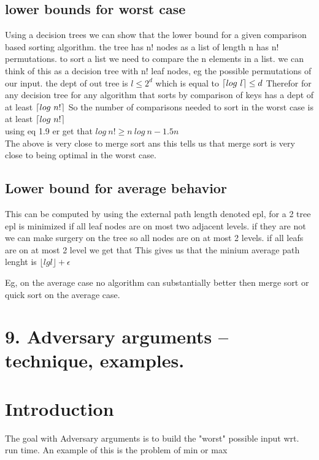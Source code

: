 \documentclass[a4paper,10pt,titlepage]{report}
\DeclarePairedDelimiter{\ceil}{\lceil}{\rceil}
\begin{document}
\subsection{lower bounds for worst case}
Using a decision trees we can show that the lower bound for a given comparison based sorting algorithm. the tree has n! nodes as a list of length n has n! permutations. to sort a list we need to compare the n elements in a list. we can think of this as a decision tree with n! leaf nodes, eg the possible permutations of our input. the dept of out tree is $l \leq 2^d$ which is equal to $\ceil{log \ l} \leq d$ Therefor for any decision tree for any algorithm that sorts by comparison of keys has a dept of at least $\ceil{log \ n!}$
So the number of comparisons needed to sort in the worst case is at least $\ceil{log \ n!}$ \\

using eq 1.9 er get that $ log \ n! \geq n \ log \ n - 1.5n$\\

The above is very close to merge sort ans this tells us that merge sort is very close to being optimal in the worst case.

\subsection{Lower bound for average behavior}

This can be computed by using the external path length denoted epl, for a 2 tree epl is minimized if all leaf nodes are on most two adjacent levels. if they are not we can make surgery on the tree so all nodes are on at most 2 levels. if all leafs are on at most 2 level we get that This gives us that the minium average path lenght is $\lfloor lg l \rfloor + \epsilon$

Eg, on the average case no algorithm can substantially better then merge sort or quick sort on the average case.\\





\newpage
\section{9. Adversary arguments – technique, examples.}

\section{Introduction}
The goal with Adversary arguments is to build the "worst" possible input wrt. run time. An example of this is the problem of min or max\\
\end{document}
